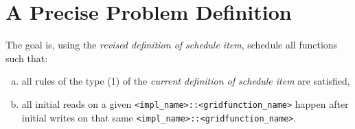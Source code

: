 \pagebreak
\section{A Precise Problem Definition}

The goal is, using the \emph{revised definition of schedule item}, schedule
all functions such that:

  \begin{enumerate}[(a)]

  \item  all rules of the type (1) of the \emph{current definition of schedule
         item} are satisfied,

  \item  all initial reads on a given \texttt{<impl\_name>::<gridfunction\_name>}
         happen after initial writes on that same \texttt{<impl\_name>::<gridfunction\_name>}.

  \end{enumerate}

